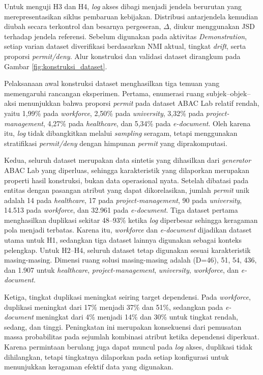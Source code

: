 Untuk menguji H3 dan H4, \textit{log} akses dibagi menjadi jendela berurutan yang merepresentasikan siklus pembaruan kebijakan. 
Distribusi antarjendela kemudian diubah secara terkontrol dan besarnya pergeseran, $\Delta$, diukur menggunakan JSD terhadap jendela referensi. 
Sebelum digunakan pada aktivitas \textit{Demonstration}, setiap varian dataset diverifikasi berdasarkan NMI aktual, tingkat \textit{drift}, serta proporsi \textit{permit/deny}. 
Alur konstruksi dan validasi dataset dirangkum pada Gambar \ref{fig:konstruksi_dataset}.

Pelaksanaan awal konstruksi dataset menghasilkan tiga temuan yang memengaruhi rancangan eksperimen. 
Pertama, enumerasi ruang subjek–objek–aksi menunjukkan bahwa proporsi \textit{permit} pada dataset ABAC Lab relatif rendah, yaitu 1,99\% pada \textit{workforce}, 2,50\% pada \textit{university}, 3,32\% pada \textit{project-management}, 4,27\% pada \textit{healthcare}, dan 5,34\% pada \textit{e-document}. 
Oleh karena itu, \textit{log} tidak dibangkitkan melalui \textit{sampling} seragam, tetapi menggunakan stratifikasi \textit{permit/deny} dengan himpunan \textit{permit} yang diprakomputasi.

Kedua, seluruh dataset merupakan data sintetis yang dihasilkan dari \textit{generator} ABAC Lab yang diperluas, sehingga karakteristik yang dilaporkan merupakan properti hasil konstruksi, bukan data operasional nyata. 
Setelah dibatasi pada entitas dengan pasangan atribut yang dapat dikorelasikan, jumlah \textit{permit} unik adalah 14 pada \textit{healthcare}, 17 pada \textit{project-management}, 90 pada \textit{university}, 14.513 pada \textit{workforce}, dan 32.961 pada \textit{e-document}. 
Tiga dataset pertama menghasilkan duplikasi sekitar 48–93\% ketika \textit{log} diperbesar sehingga keragaman pola menjadi terbatas. 
Karena itu, \textit{workforce} dan \textit{e-document} dijadikan dataset utama untuk H1, sedangkan tiga dataset lainnya digunakan sebagai konteks pelengkap. 
Untuk H2–H4, seluruh dataset tetap digunakan sesuai karakteristik masing-masing. 
Dimensi ruang solusi masing-masing adalah (D=46), 51, 54, 436, dan 1.907 untuk \textit{healthcare}, \textit{project-management}, \textit{university}, \textit{workforce}, dan \textit{e-document}.

Ketiga, tingkat duplikasi meningkat seiring target dependensi. 
Pada \textit{workforce}, duplikasi meningkat dari 17\% menjadi 37\% dan 51\%, sedangkan pada \textit{e-document} meningkat dari 4\% menjadi 14\% dan 30\% untuk tingkat rendah, sedang, dan tinggi. 
Peningkatan ini merupakan konsekuensi dari pemusatan massa probabilitas pada sejumlah kombinasi atribut ketika dependensi diperkuat. 
Karena permintaan berulang juga dapat muncul pada \textit{log} akses, duplikasi tidak dihilangkan, tetapi tingkatnya dilaporkan pada setiap konfigurasi untuk menunjukkan keragaman efektif data yang digunakan.

